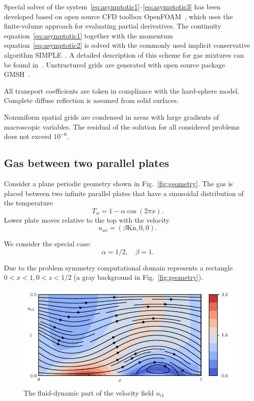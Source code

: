 \documentclass[smallextended, referee]{svjour3} %
\newcommand{\Kn}{\mathrm{Kn}}
\begin{document}
Special solver of the system~\eqref{eq:asymptotic1}--\eqref{eq:asymptotic3}
has been developed based on open source CFD toolbox OpenFOAM\textregistered{}~\cite{OpenFOAM1998},
which uses the finite-volume approach for evaluating partial derivatives.
The continuity equation~\eqref{eq:asymptotic1} together with the momentum equation~\eqref{eq:asymptotic2}
is solved with the commonly used implicit conservative algorithm SIMPLE~\cite{SIMPLE}.
A detailed description of this scheme for gas mixtures can be found in~\cite{Laneryd2007}.
Unstructured grids are generated with open source package GMSH~\cite{GMSH}.

All transport coefficients are taken in compliance with the hard-sphere model.
Complete diffuse reflection is assumed from solid surfaces.

Nonuniform spatial grids are condensed in areas with large gradients of macroscopic variables.
The residual of the solution for all considered problems does not exceed \(10^{-6}\).

\subsection{Gas between two parallel plates}

Consider a plane periodic geometry shown in Fig.~\ref{fig:geometry}.
The gas is placed between two infinite parallel plates
that have a sinusoidal distribution of the temperature
\begin{equation}
	T_w = 1-\alpha\cos(2\pi x).
\end{equation}
Lower plate moves relative to the top with the velocity
\begin{equation}
	u_{wi} = (\beta\Kn,0,0).
\end{equation}

We consider the special case:
\[ \alpha=1/2, \quad \beta = 1. \]

Due to the problem symmetry computational domain represents a rectangle \(0<x<1, 0<z<1/2\)
(a gray background in Fig.~\ref{fig:geometry}).

\begin{figure}
	\centering
	\includegraphics{Fig5}
	\caption{The fluid-dynamic part of the velocity field \(u_{i1}\)}\label{fig:moving:fluid}
\end{figure}
\end{document}
